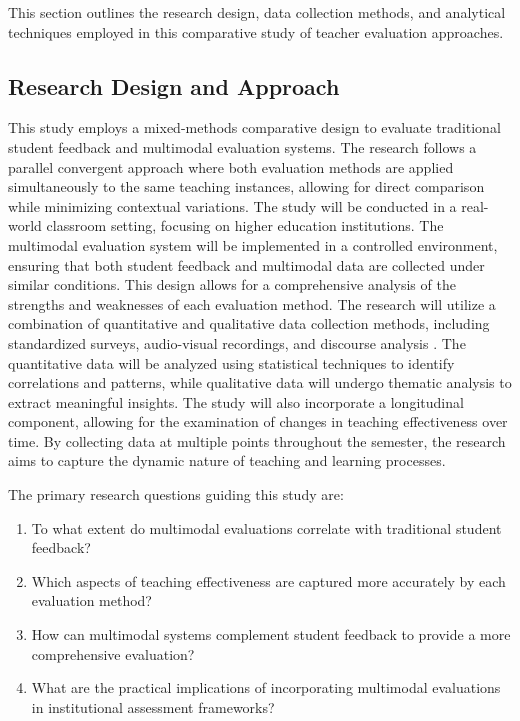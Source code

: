 This section outlines the research design, data collection methods, and analytical techniques employed in this comparative study of teacher evaluation approaches.

\subsection{Research Design and Approach}
This study employs a mixed-methods comparative design to evaluate traditional student feedback and multimodal evaluation systems. The research follows a parallel convergent approach where both evaluation methods are applied simultaneously to the same teaching instances, allowing for direct comparison while minimizing contextual variations.
The study will be conducted in a real-world classroom setting, focusing on higher education institutions. The multimodal evaluation system will be implemented in a controlled environment, ensuring that both student feedback and multimodal data are collected under similar conditions. This design allows for a comprehensive analysis of the strengths and weaknesses of each evaluation method.
The research will utilize a combination of quantitative and qualitative data collection methods, including standardized surveys, audio-visual recordings, and discourse analysis \cite{dmello2012multimodal, ochoa2016multimodal}. The quantitative data will be analyzed using statistical techniques to identify correlations and patterns, while qualitative data will undergo thematic analysis to extract meaningful insights.
The study will also incorporate a longitudinal component, allowing for the examination of changes in teaching effectiveness over time. By collecting data at multiple points throughout the semester, the research aims to capture the dynamic nature of teaching and learning processes.

The primary research questions guiding this study are:

\begin{enumerate}
    \item To what extent do multimodal evaluations correlate with traditional student feedback?
    \item Which aspects of teaching effectiveness are captured more accurately by each evaluation method?
    \item How can multimodal systems complement student feedback to provide a more comprehensive evaluation?
    \item What are the practical implications of incorporating multimodal evaluations in institutional assessment frameworks?
\end{enumerate}

